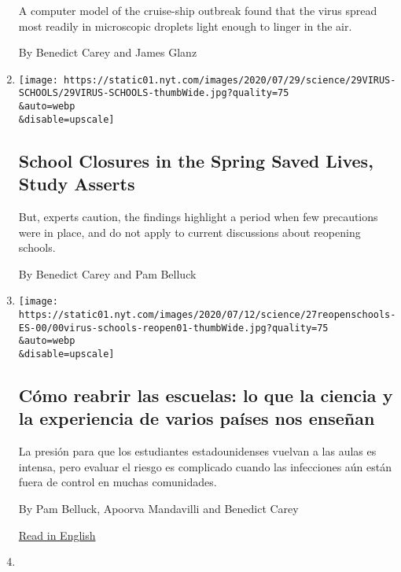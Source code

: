 \begin{enumerate}
  A computer model of the cruise-ship outbreak found that the virus
  spread most readily in microscopic droplets light enough to linger in
  the air.

  By Benedict Carey and James Glanz
\item
  \href{/2020/07/29/health/covid-school-reopening.html}{}

  \texttt{[image: https://static01.nyt.com/images/2020/07/29/science/29VIRUS-SCHOOLS/29VIRUS-SCHOOLS-thumbWide.jpg?quality=75\\\&auto=webp\\\&disable=upscale]}

  \hypertarget{school-closures-in-the-spring-saved-lives-study-asserts}{%
  \subsection{School Closures in the Spring Saved Lives, Study
  Asserts}\label{school-closures-in-the-spring-saved-lives-study-asserts}}

  But, experts caution, the findings highlight a period when few
  precautions were in place, and do not apply to current discussions
  about reopening schools.

  By Benedict Carey and Pam Belluck
\item
  \href{/es/2020/07/27/espanol/ciencia-y-tecnologia/regreso-a-clases-coronavirus.html}{}

  \texttt{[image: https://static01.nyt.com/images/2020/07/12/science/27reopenschools-ES-00/00virus-schools-reopen01-thumbWide.jpg?quality=75\\\&auto=webp\\\&disable=upscale]}

  \hypertarget{cuxf3mo-reabrir-las-escuelas-lo-que-la-ciencia-y-la-experiencia-de-varios-pauxedses-nos-enseuxf1an}{%
  \subsection{Cómo reabrir las escuelas: lo que la ciencia y la
  experiencia de varios países nos
  enseñan}\label{cuxf3mo-reabrir-las-escuelas-lo-que-la-ciencia-y-la-experiencia-de-varios-pauxedses-nos-enseuxf1an}}

  La presión para que los estudiantes estadounidenses vuelvan a las
  aulas es intensa, pero evaluar el riesgo es complicado cuando las
  infecciones aún están fuera de control en muchas comunidades.

  By Pam Belluck, Apoorva Mandavilli and Benedict Carey

  \href{https://www.nytimes.com/2020/07/11/health/coronavirus-schools-reopen.html}{Read
  in English}
\item
  \href{/2020/07/11/health/coronavirus-schools-reopen.html}{}


\end{enumerate}
